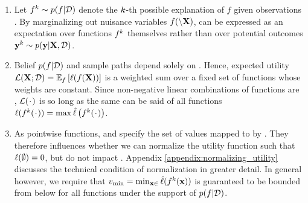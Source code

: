 \begin{enumerate}[label=\arabic*.,leftmargin=16pt,rightmargin=8pt]
\item Let \(f^{k} \sim p(f | \mathcal{D})\) denote the \(k\)-th possible explanation of \blackbox{} \(f\) given observations \data. By marginalizing out nuisance variables \(f( \setminus \mathbf{X})\), \Acq{} can be expressed as an expectation over functions \(f^{k}\) themselves rather than over potential outcomes \(\mathbf{y}^{k} \sim p(\mathbf{y}|\mathbf{X}, \mathcal{D})\).

\item 
Belief \(p(f | \mathcal{D})\) and sample paths  depend solely on \data{}. Hence, expected utility \(\mathcal{L}(\mathbf{X}; \mathcal{D}) = \mathbb{E}_{f}\left[\ell(f(\mathbf{X}))\right]\) is a weighted sum over a fixed set of functions whose weights are constant.
% 
Since non-negative linear combinations of \SM{} functions are \SM{} \cite{krause14}, \(\Acq(\argdot)\) is \SM{} so long as the same can be said of all functions \(\acq(\sample{f}(\argdot)) = \max \uacq\left(\sample{f}(\argdot)\right)\).
\item
As pointwise functions,  and \uacq{} specify the set of values mapped to by \xspace{}. They therefore influences whether we can normalize the utility function such that \(\ell(\emptyset) = 0\), but do not impact \SM{}.   
Appendix \ref{appendix:normalizing_utility} discusses the technical condition of normalization in greater detail. In general however, we require that \(v_{\min} = \min_{\mathbf{x} \in }\hat{\ell}(f^{k}(\mathbf{x}))\) is guaranteed to be bounded from below for all functions under the support of \(p(f|\mathcal{D})\).
\end{enumerate}


